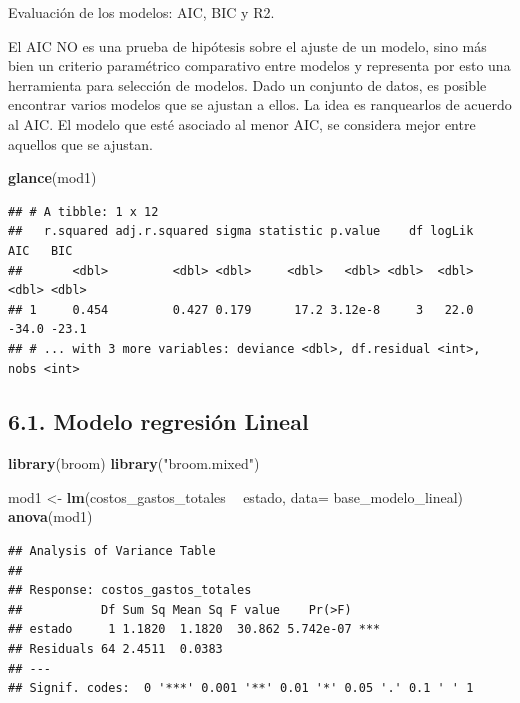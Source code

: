 \documentclass[
  11pt,
  a4paper,
]{book}
\newenvironment{Shaded}{\begin{snugshade}}{\end{snugshade}}
\newcommand{\DataTypeTok}[1]{\textcolor[rgb]{0.13,0.29,0.53}{#1}}
\newcommand{\KeywordTok}[1]{\textcolor[rgb]{0.13,0.29,0.53}{\textbf{#1}}}
\newcommand{\NormalTok}[1]{#1}
\newcommand{\OperatorTok}[1]{\textcolor[rgb]{0.81,0.36,0.00}{\textbf{#1}}}
\newcommand{\StringTok}[1]{\textcolor[rgb]{0.31,0.60,0.02}{#1}}
\begin{document}
Evaluación de los modelos: AIC, BIC y R2.

El AIC NO es una prueba de hipótesis sobre el ajuste de un modelo, sino
más bien un criterio paramétrico comparativo entre modelos y representa
por esto una herramienta para selección de modelos. Dado un conjunto de
datos, es posible encontrar varios modelos que se ajustan a ellos. La
idea es ranquearlos de acuerdo al AIC. El modelo que esté asociado al
menor AIC, se considera mejor entre aquellos que se ajustan.

\begin{Shaded}
\begin{Highlighting}[]
\KeywordTok{glance}\NormalTok{(mod1)}
\end{Highlighting}
\end{Shaded}

\begin{verbatim}
## # A tibble: 1 x 12
##   r.squared adj.r.squared sigma statistic p.value    df logLik   AIC   BIC
##       <dbl>         <dbl> <dbl>     <dbl>   <dbl> <dbl>  <dbl> <dbl> <dbl>
## 1     0.454         0.427 0.179      17.2 3.12e-8     3   22.0 -34.0 -23.1
## # ... with 3 more variables: deviance <dbl>, df.residual <int>, nobs <int>
\end{verbatim}

\hypertarget{modelo-regresiuxf3n-lineal}{%
\subsection{6.1. Modelo regresión
Lineal}\label{modelo-regresiuxf3n-lineal}}

\begin{Shaded}
\begin{Highlighting}[]
\KeywordTok{library}\NormalTok{(broom)}
\KeywordTok{library}\NormalTok{(}\StringTok{"broom.mixed"}\NormalTok{)}

\NormalTok{mod1 <-}\StringTok{ }\KeywordTok{lm}\NormalTok{(costos_gastos_totales }\OperatorTok{~}\StringTok{  }\NormalTok{estado, }\DataTypeTok{data=}\NormalTok{ base_modelo_lineal) }
\KeywordTok{anova}\NormalTok{(mod1)}
\end{Highlighting}
\end{Shaded}

\begin{verbatim}
## Analysis of Variance Table
## 
## Response: costos_gastos_totales
##           Df Sum Sq Mean Sq F value    Pr(>F)    
## estado     1 1.1820  1.1820  30.862 5.742e-07 ***
## Residuals 64 2.4511  0.0383                      
## ---
## Signif. codes:  0 '***' 0.001 '**' 0.01 '*' 0.05 '.' 0.1 ' ' 1
\end{verbatim}
\end{document}

